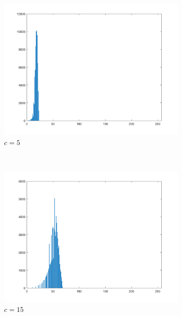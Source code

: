 \documentclass{article}
\begin{document}
\begin{enumerate}[label=(\alph*)]
    \begin{figure}[!htb]
        \centering
        \begin{subfigure}[b]{0.3\textwidth}
            \includegraphics[width=\textwidth]{img/hist_LT5.png}
            \caption{$c = 5$}
        \end{subfigure}
        ~
        \begin{subfigure}[b]{0.3\textwidth}
            \includegraphics[width=\textwidth]{img/hist_LT15.png}
            \caption{$c = 15$}
        \end{subfigure}
        ~
        \begin{subfigure}[b]{0.3\textwidth}

\end{subfigure}
\end{figure}
\end{enumerate}
\end{document}
